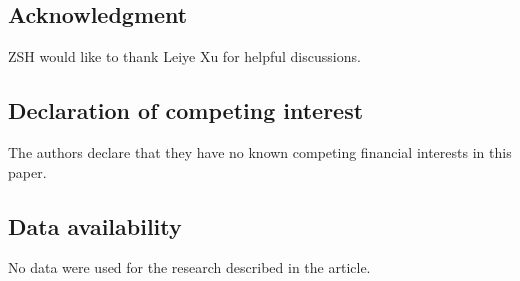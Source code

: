 \documentclass[reqno,11pt]{amsart}
\theoremstyle{definition}
\begin{document}
\subsection*{Acknowledgment}
ZSH would like to thank Leiye Xu for helpful discussions.

\subsection*{Declaration of competing interest}
The authors declare that they have no known competing financial interests in this paper.



\subsection*{Data availability}
No data were used for the research described in the article.
\end{document}
